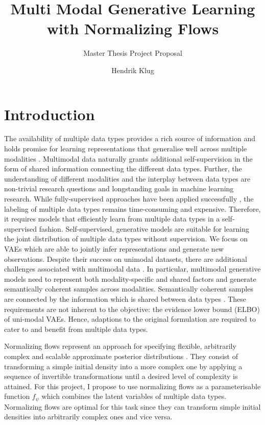 \documentclass[english]{scrartcl}
\title{Multi Modal Generative Learning with Normalizing Flows}
\subtitle{Master Thesis Project Proposal}
\author{Hendrik Klug}
\begin{document}
    \maketitle


    \section{Introduction}
    The availability of multiple data types provides a rich source of information and holds promise for learning representations that generalise well across multiple modalities \parencite{baltrusaitis_multimodal_2019}.
    Multimodal data naturally grants additional self-supervision in the form of shared information connecting the different data types.
    Further, the understanding of different modalities and the interplay between data types are non-trivial research questions and longstanding goals in machine learning research.
    While fully-supervised approaches have been applied successfully \parencite{karpathy_deep_2015,tsai_learning_2018}, the labeling of multiple data types remains time-consuming and expensive.
    Therefore, it requires models that efficiently learn from multiple data types in a self-supervised fashion.
    Self-supervised, generative models are suitable for learning the joint distribution of multiple data types without supervision.
    We focus on VAEs \parencite{kingma_auto-encoding_2014,rezende_stochastic_2014} which are able to jointly infer representations and generate new observations.
    Despite their success on unimodal datasets, there are additional challenges associated with multimodal data \parencite{suzuki_joint_2016, vedantam_generative_2018}.
    In particular, multimodal generative models need to represent both modality-specific and shared factors and generate semantically coherent samples across modalities.
    Semantically coherent samples are connected by the information which is shared between data types \parencite{shi_variational_2019}.
    These requirements are not inherent to the objective: the evidence lower bound (ELBO) of uni-modal VAEs.
    Hence, adaptions to the original formulation are required to cater to and benefit from multiple data types.

    Normalizing flows represent an approach for specifying flexible, arbitrarily complex and scalable approximate posterior distributions \parencite{papamakarios_normalizing_2019,rezende_variational_2016}.
    They consist of transforming a simple initial density into a more complex one by applying a sequence of invertible transformations until a desired level of complexity is attained.
    For this project, I propose to use normalizing flows as a parameterisable function $f_\psi$ which combines the latent variables of multiple data types.
    Normalizing flows are optimal for this task since they can transform simple initial densities into arbitrarily complex ones and vice versa.
\end{document}
